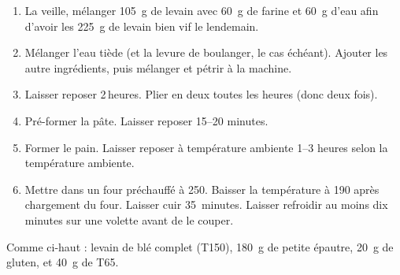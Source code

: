 
\begin{ingredients}
\end{ingredients}


\begin{recipe}
  \begin{enumerate}

  \item La veille, mélanger 105~g de levain avec 60~g de farine et
    60~g d'eau afin d'avoir les 225~g de levain bien vif le lendemain.

  \item Mélanger l'eau tiède (et la levure de boulanger, le cas
    échéant).  Ajouter les autre ingrédients, puis mélanger et pétrir
    à la machine.
    
  \item Laisser reposer 2$\,$\fracH heures.  Plier en deux toutes les
    heures (donc deux fois).
    
  \item Pré-former la pâte.  Laisser reposer 15--20 minutes.
    
  \item Former le pain.  Laisser reposer à température ambiente 1--3
    heures selon la température ambiente.
    
  \item Mettre dans un four préchauffé à 250\degreeC.  Baisser la
    température à 190\degreeC{} après chargement du four.  Laisser
    cuir 35~minutes.  Laisser refroidir au moins dix minutes sur une
    volette avant de le couper.

  \end{enumerate}
\end{recipe}




Comme ci-haut : levain de blé complet (T150), 180~g de petite épautre,
20~g de gluten, et 40~g de T65.

